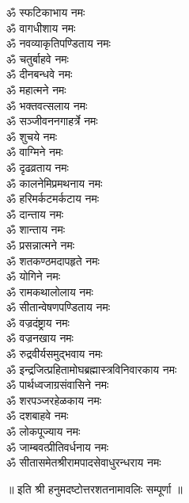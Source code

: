 \begin{multicols}{2}
\begin{flushleft}
ॐ स्फटिकाभाय नमः\\
ॐ वागधीशाय नमः\hfill{}\\
ॐ नवव्याकृतिपण्डिताय नमः\\
ॐ चतुर्बाहवे नमः\\
ॐ दीनबन्धवे नमः\\
ॐ महात्मने नमः\\
ॐ भक्तवत्सलाय नमः\\
ॐ सञ्जीवननगाहर्त्रे नमः\\
ॐ शुचये नमः\\
ॐ वाग्मिने नमः\\
ॐ दृढव्रताय नमः\\
ॐ कालनेमिप्रमथनाय नमः\hfill{}\\
ॐ हरिमर्कटमर्कटाय नमः\\
ॐ दान्ताय नमः\\
ॐ शान्ताय नमः\\
ॐ प्रसन्नात्मने नमः\\
ॐ शतकण्ठमदापहृते नमः\\
ॐ योगिने नमः\\
ॐ रामकथालोलाय नमः\\
ॐ सीतान्वेषणपण्डिताय नमः\\
ॐ वज्रदंष्ट्राय नमः\\
ॐ वज्रनखाय नमः\hfill{}\\
ॐ रुद्रवीर्यसमुद्भवाय नमः\\
ॐ इन्द्रजित्प्रहितामोघ\-ब्रह्मास्त्रविनिवारकाय नमः\\
ॐ पार्थध्वजाग्रसंवासिने नमः\\
ॐ शरपञ्जरहेळकाय नमः\\
ॐ दशबाहवे नमः\\
ॐ लोकपूज्याय नमः\\
ॐ जाम्बवत्प्रीतिवर्धनाय नमः\\
ॐ सीतासमेतश्रीराम\-पादसेवाधुरन्धराय नमः\\
\end{flushleft}
\end{multicols}
\centerline{॥ इति श्री हनुमदष्टोत्तरशतनामावलिः सम्पूर्णा ॥}

